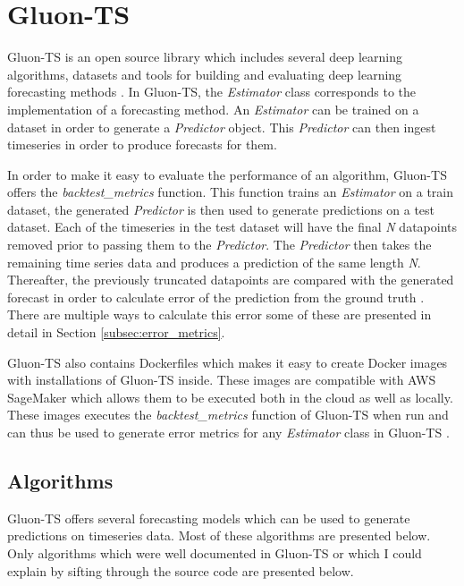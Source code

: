 \section{Gluon-TS}
\label{subsec:gluonts_overview}
Gluon-TS is an open source library which includes several deep learning algorithms, datasets and tools for building and evaluating deep learning forecasting methods \cite{gluonts-website,gluonts_paper,gluonts-github}. In Gluon-TS, the \textit{Estimator} class corresponds to the implementation of a forecasting method. An \textit{Estimator} can be trained on a dataset in order to generate a \textit{Predictor} object. This \textit{Predictor} can then ingest timeseries in order to produce forecasts for them.

In order to make it easy to evaluate the performance of an algorithm, Gluon-TS offers the \textit{backtest\_metrics} function. This function trains an \textit{Estimator} on a train dataset, the generated \textit{Predictor} is then used to generate predictions on a test dataset. Each of the timeseries in the test dataset will have the final \textit{N} datapoints removed prior to passing them to the \textit{Predictor}. The \textit{Predictor} then takes the remaining time series data and produces a prediction of the same length \textit{N}. Thereafter, the previously truncated datapoints are compared with the generated forecast in order to calculate error of the prediction from the ground truth \cite{gluonts-github}. There are multiple ways to calculate this error some of these are presented in detail in Section \ref{subsec:error_metrics}.

Gluon-TS also contains Dockerfiles which makes it easy to create Docker images with installations of Gluon-TS inside. These images are compatible with AWS SageMaker which allows them to be executed both in the cloud as well as locally. These images executes the \textit{backtest\_metrics} function of Gluon-TS when run and can thus be used to generate error metrics for any \textit{Estimator} class in Gluon-TS \cite{gluonts-github}.

\subsection{Algorithms}
\label{algorithms}
Gluon-TS offers several forecasting models which can be used to generate predictions on timeseries data. Most of these algorithms are presented below. Only algorithms which were well documented in Gluon-TS or which I could explain by sifting through the source code are presented below.

